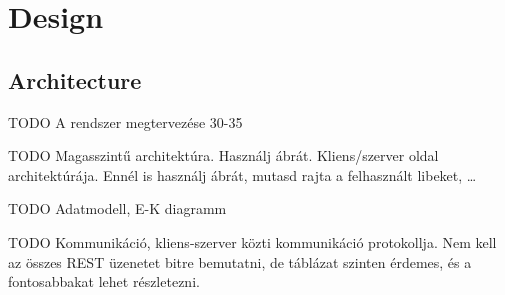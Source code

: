 \chapter{Design}

\section{Architecture}

TODO A rendszer megtervezése 30-35%

TODO Magasszintű architektúra. Használj ábrát. Kliens/szerver oldal architektúrája. Ennél is használj ábrát, mutasd rajta a felhasznált libeket, …

TODO Adatmodell, E-K diagramm

TODO Kommunikáció, kliens-szerver közti kommunikáció protokollja. Nem kell az összes REST üzenetet bitre bemutatni, de táblázat szinten érdemes, és a fontosabbakat lehet részletezni.